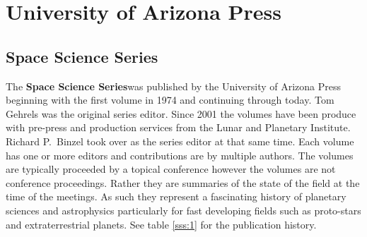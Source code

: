 
\section{University of Arizona Press}  
\subsection{Space Science Series}
The {\bfseries Space Science Series}\footnotemark was published by the
University of Arizona Press beginning with the first volume in 1974
and continuing through today.  Tom Gehrels was the original series
editor. Since 2001 the volumes have been produce with pre-press and
production services from the Lunar and Planetary Institute. Richard
P.\ Binzel took over as the series editor at that same time.  Each
volume has one or more editors and contributions are by multiple
authors. The volumes are typically proceeded by a topical conference
however the volumes are not conference proceedings. Rather they are
summaries of the state of the field at the time of the meetings.  As
such they represent a fascinating history of planetary sciences and
astrophysics particularly for fast developing fields such as
proto-stars and extraterrestrial planets. See table \ref{sss:1} for
the publication history.

  
